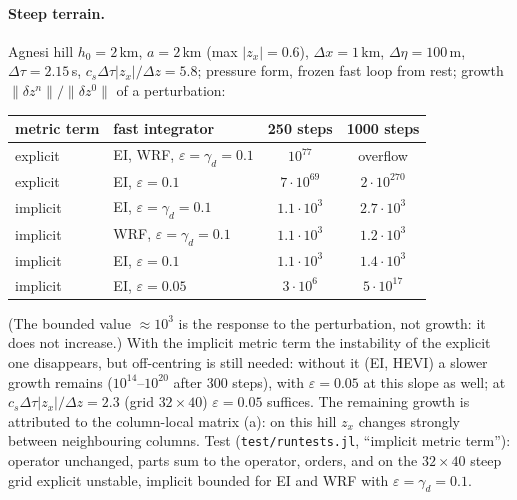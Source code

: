 \documentclass[11pt,a4paper]{article}
\newcommand{\dtau}{\Delta\tau}
\newcommand{\code}[1]{\texttt{\small #1}}
\begin{document}
\paragraph{Steep terrain.} Agnesi hill $h_0=2$\,km, $a=2$\,km (max $|z_x|=0.6$), $\Delta x=1$\,km, $\Delta\eta=100$\,m, $\dtau=2.15$\,s,
$c_s\dtau|z_x|/\Delta z=5.8$; pressure form, frozen fast loop from rest; growth $\|\delta z^n\|/\|\delta z^0\|$ of a perturbation:
\begin{center}\small
\begin{tabular}{llcc}\toprule
metric term & fast integrator & 250 steps & 1000 steps\\\midrule
explicit & EI, WRF, $\varepsilon=\gamma_d=0.1$ & $10^{77}$ & overflow\\
explicit & EI, $\varepsilon=0.1$ & $7\cdot10^{69}$ & $2\cdot10^{270}$\\
implicit & EI, $\varepsilon=\gamma_d=0.1$ & $1.1\cdot10^3$ & $2.7\cdot10^3$\\
implicit & WRF, $\varepsilon=\gamma_d=0.1$ & $1.1\cdot10^3$ & $1.2\cdot10^3$\\
implicit & EI, $\varepsilon=0.1$ & $1.1\cdot10^3$ & $1.4\cdot10^3$\\
implicit & EI, $\varepsilon=0.05$ & $3\cdot10^6$ & $5\cdot10^{17}$\\\bottomrule
\end{tabular}
\end{center}
(The bounded value $\approx10^3$ is the response to the perturbation, not growth: it does not increase.) With the
implicit metric term the instability of the explicit one disappears, but off-centring is still needed:
without it (EI, HEVI) a slower growth remains ($10^{14}$--$10^{20}$ after 300 steps), with $\varepsilon=0.05$ at this slope as
well; at $c_s\dtau|z_x|/\Delta z=2.3$ (grid $32\times40$) $\varepsilon=0.05$ suffices. The remaining growth is attributed to the
column-local matrix (a): on this hill $z_x$ changes strongly between neighbouring columns. Test
(\code{test/runtests.jl}, ``implicit metric term''): operator unchanged, parts sum to the operator, orders,
and on the $32\times40$ steep grid explicit unstable, implicit bounded for EI and WRF with $\varepsilon=\gamma_d=0.1$.
\end{document}
